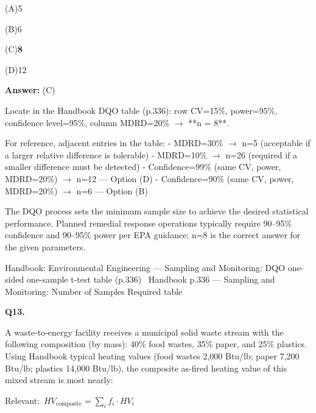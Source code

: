 \documentclass[11pt]{article}
\newcommand{\correct}[1]{\textbf{#1}\;{\color{accent}$\checkmark$}}
\newcommand{\optline}[2]{\par\noindent\hspace{1.2em}(#1)\hspace{0.6em}#2}
\begin{document}
\optline{A}{5}
\optline{B}{6}
\optline{C}{\correct{8}}
\optline{D}{12}
\par\vspace{3pt}
\vspace{2pt}\par\noindent\colorbox{boxbg}{\parbox{\dimexpr\linewidth-2\fboxsep\relax}{%
\vspace{2pt}\textbf{Answer:} (C)\par\vspace{2pt}
{\small Locate in the Handbook DQO table (p.336): row CV=15\%, power=95\%, confidence level=95\%, column MDRD=20\% $\rightarrow$ **n = 8**.

For reference, adjacent entries in the table:
- MDRD=30\% $\rightarrow$ n=5 (acceptable if a larger relative difference is tolerable)
- MDRD=10\% $\rightarrow$ n=26 (required if a smaller difference must be detected)
- Confidence=99\% (same CV, power, MDRD=20\%) $\rightarrow$ n=12 --- Option (D)
- Confidence=90\% (same CV, power, MDRD=20\%) $\rightarrow$ n=6 --- Option (B)

The DQO process sets the minimum sample size to achieve the desired statistical performance. Planned remedial response operations typically require 90--95\% confidence and 90--95\% power per EPA guidance; n=8 is the correct answer for the given parameters.}\par\vspace{2pt}
{\footnotesize\color{soft}Handbook: Environmental Engineering --- Sampling and Monitoring: DQO one-sided one-sample t-test table (p.336) \textbullet\ Handbook p.336 --- Sampling and Monitoring: Number of Samples Required table}\vspace{2pt}
}}
\vspace{9pt}
\filbreak
\textbf{\color{accent}Q13.}\par\vspace{2pt}
A waste-to-energy facility receives a municipal solid waste stream with the following composition (by mass): 40\% food wastes, 35\% paper, and 25\% plastics. Using Handbook typical heating values (food wastes 2,000 Btu/lb; paper 7,200 Btu/lb; plastics 14,000 Btu/lb), the composite as-fired heating value of this mixed stream is most nearly:\par\vspace{3pt}
{\small\color{soft}Relevant:}\ $HV_{\text{composite}} = \sum_i f_i \cdot HV_i$\par\vspace{3pt}
\end{document}
